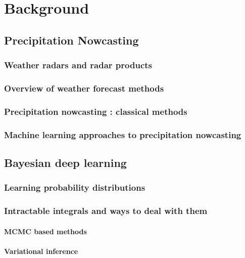 \chapter{Background}
\label{chapter:background} 

\section{Precipitation Nowcasting}

\subsection{Weather radars and radar products}

\subsection{Overview of weather forecast methods}

\subsection{Precipitation nowcasting : classical methods}

\subsection{Machine learning approaches to precipitation nowcasting}


\section{Bayesian deep learning}

\subsection{Learning probability distributions}

\subsection{Intractable integrals and ways to deal with them}
\subsubsection{MCMC based methods}
\subsubsection{Variational inference}
